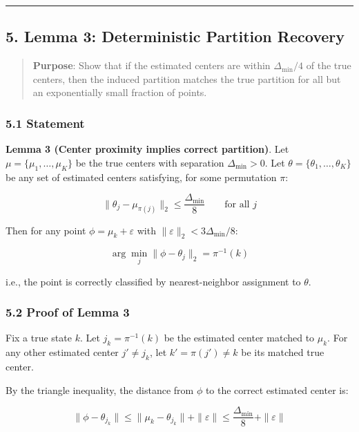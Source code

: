 \documentclass[
  12pt,
]{article}
\begin{document}
\begin{center}\rule{0.5\linewidth}{0.5pt}\end{center}

\subsection{5. Lemma 3: Deterministic Partition
Recovery}\label{lemma-3-deterministic-partition-recovery}

\begin{quote}
\textbf{Purpose}: Show that if the estimated centers are within
\(\Delta_{\min}/4\) of the true centers, then the induced partition
matches the true partition for all but an exponentially small fraction
of points.
\end{quote}

\subsubsection{5.1 Statement}\label{statement-2}

\textbf{Lemma 3 (Center proximity implies correct partition)}. Let
\(\mu = \{\mu_1,\dots,\mu_K\}\) be the true centers with separation
\(\Delta_{\min} > 0\). Let \(\theta = \{\theta_1,\dots,\theta_K\}\) be
any set of estimated centers satisfying, for some permutation \(\pi\):

\[\|\theta_j - \mu_{\pi(j)}\|_2 \leq \frac{\Delta_{\min}}{8} \qquad \text{for all } j\]

Then for any point \(\phi = \mu_k + \varepsilon\) with
\(\|\varepsilon\|_2 < 3\Delta_{\min}/8\):

\[\arg \min_{j} \|\phi - \theta_j\|_2 = \pi^{-1}(k)\]

i.e., the point is correctly classified by nearest-neighbor assignment
to \(\theta\).

\subsubsection{5.2 Proof of Lemma 3}\label{proof-of-lemma-3}

Fix a true state \(k\). Let \(j_k = \pi^{-1}(k)\) be the estimated
center matched to \(\mu_k\). For any other estimated center
\(j' \neq j_k\), let \(k' = \pi(j') \neq k\) be its matched true center.

By the triangle inequality, the distance from \(\phi\) to the correct
estimated center is:

\[\|\phi - \theta_{j_k}\| \leq \|\mu_k - \theta_{j_k}\| + \|\varepsilon\| \leq \frac{\Delta_{\min}}{8} + \|\varepsilon\|\]
\end{document}
